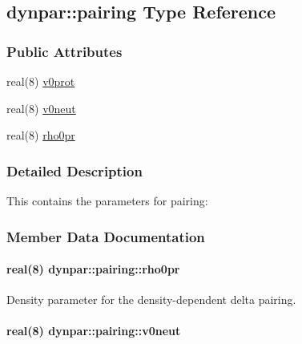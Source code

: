 \hypertarget{structdynpar_1_1pairing}{}\subsection{dynpar\+:\+:pairing Type Reference}
\label{structdynpar_1_1pairing}
\subsubsection*{Public Attributes}
\begin{DoxyCompactItemize}
\item 
real(8) \hyperlink{structdynpar_1_1pairing_a59eab10ac4785d6ac1eac3fcfa894dc2}{v0prot}
\item 
real(8) \hyperlink{structdynpar_1_1pairing_a1125911d32e55fb78bdcdc4167b78221}{v0neut}
\item 
real(8) \hyperlink{structdynpar_1_1pairing_a4d15685c596b1e30c85bd82168bb878a}{rho0pr}
\end{DoxyCompactItemize}


\subsubsection{Detailed Description}
This contains the parameters for pairing\+: 

\subsubsection{Member Data Documentation}
\paragraph[{\texorpdfstring{rho0pr}{rho0pr}}]{\setlength{\rightskip}{0pt plus 5cm}real(8) dynpar\+::pairing\+::rho0pr}\hypertarget{structdynpar_1_1pairing_a4d15685c596b1e30c85bd82168bb878a}{}\label{structdynpar_1_1pairing_a4d15685c596b1e30c85bd82168bb878a}


Density parameter for the density-\/dependent delta pairing. 

\paragraph[{\texorpdfstring{v0neut}{v0neut}}]{\setlength{\rightskip}{0pt plus 5cm}real(8) dynpar\+::pairing\+::v0neut}\hypertarget{structdynpar_1_1pairing_a1125911d32e55fb78bdcdc4167b78221}{}\label{structdynpar_1_1pairing_a1125911d32e55fb78bdcdc4167b78221}


